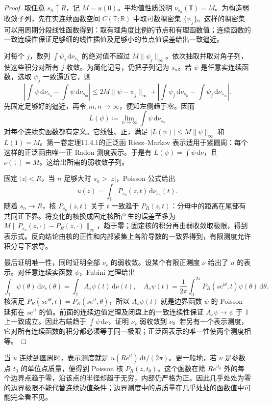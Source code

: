 \begin{proof}
取任意 \(s_n\uparrow R\)，记 \(M=u(0)\)。平均值性质说明 \(\nu_{s_n}(\mathbb T)=M\)。为构造弱收敛子列，先在实连续函数空间 \(C(\mathbb T;\mathbb R)\) 中取可数稠密集 \(\{\psi_j\}\)。这样的稠密集可以用周期分段线性函数得到：取有理角度比例的节点和有理函数值；连续函数的一致连续性保证足够细的线性插值及足够小的节点值误差给出一致逼近。

对每个 \(j\)，数列 \(\int\psi_j\,\mathrm d\nu_{s_n}\) 的绝对值不超过 \(M\|\psi_j\|_\infty\)。依次抽取并取对角子列，使这些积分对所有 \(j\) 收敛。为简化记号，仍把子列记为 \(s_n\)。若 \(\psi\) 是任意实连续函数，选取 \(\psi_j\) 一致逼近它，则
\[
 \left|\int\psi\,\mathrm d\nu_{s_n}
       -\int\psi\,\mathrm d\nu_{s_m}\right|
 \le2M\|\psi-\psi_j\|_\infty
 +\left|\int\psi_j\,\mathrm d\nu_{s_n}
       -\int\psi_j\,\mathrm d\nu_{s_m}\right|.
\]
先固定足够好的逼近，再令 \(m,n\to\infty\)，便知左侧趋于零。因而
\[
 L(\psi)\coloneqq\lim_{n\to\infty}\int\psi\,\mathrm d\nu_{s_n}
\]
对每个连续实函数都有定义。它线性、正，满足 \(|L(\psi)|\le M\|\psi\|_\infty\) 和 \(L(1)=M\)。第一卷定理11.4.1的正泛函 Riesz--Markov 表示适用于紧圆周：每个这样的正泛函由唯一正 Radon 测度表示。于是有 \(L(\psi)=\int\psi\,\mathrm d\nu\)，且 \(\nu(\mathbb T)=M\)。这给出所需的弱收敛子列。

固定 \(|z|<R\)，当 \(n\) 足够大时 \(s_n>|z|\)，Poisson 公式给出
\[
 u(z)=\int_{\mathbb T}P_{s_n}(z,t)\,\mathrm d\nu_{s_n}(t).
\]
随着 \(s_n\to R\)，核 \(P_{s_n}(z,t)\) 关于 \(t\) 一致趋于 \(P_R(z,t)\)：分母中的距离在尾部有共同正下界。将变化的核换成固定核所产生的误差至多为
\(M\|P_{s_n}(z,\cdot)-P_R(z,\cdot)\|_\infty\)，趋于零；固定核的积分再由弱收敛取极限，得到表示式。反向结论由核的正性和内部紧集上各阶导数的一致界得到，有限测度允许积分号下求导。

最后证明唯一性，同时证明全部 \(\nu_s\) 的弱收敛。设某个有限正测度 \(\nu\) 给出了 \(u\) 的表示。对任意连续实函数 \(\psi\)，Fubini 定理给出
\[
 \int_{\mathbb T}\psi(\theta)\,\mathrm d\nu_s(\theta)
 =\int_{\mathbb T}A_s\psi(t)\,\mathrm d\nu(t),
 \quad
 A_s\psi(t)=\frac{1}{2\pi}\int_0^{2\pi}
 P_R(se^{\mathrm i\theta},t)\psi(\theta)\,\mathrm d\theta.
\]
核满足 \(P_R(se^{\mathrm i\theta},t)=P_R(se^{\mathrm i t},\theta)\)，所以 \(A_s\psi(t)\) 就是边界函数 \(\psi\) 的 Poisson 延拓在 \(se^{\mathrm i t}\) 的值。前面的连续边值定理及闭盘上的一致连续性保证 \(A_s\psi\to\psi\) 于 \(\mathbb T\) 上一致成立。因此右端趋于 \(\int\psi\,\mathrm d\nu\)，证明 \(\nu_s\) 弱收敛到 \(\nu\)。若另有一个表示测度，它对所有连续函数的积分都必须等于同一极限；正泛函表示的唯一性使两个测度相等。
\end{proof}

当 \(u\) 连续到圆周时，表示测度就是 \(u(Re^{\mathrm i t})\,\mathrm dt/(2\pi)\)。更一般地，若 \(\nu\) 是参数点 \(t_0\) 的单位点质量，便得到 Poisson 核 \(P_R(z,t_0)\)。这个函数在除 \(Re^{\mathrm i t_0}\) 外的每个边界点趋于零，沿该点的半径却趋于无穷，内部仍严格为正。因此几乎处处为零的边界极限不能代替连续边值条件；边界测度中的点质量在几乎处处的函数值中可能完全看不见。
